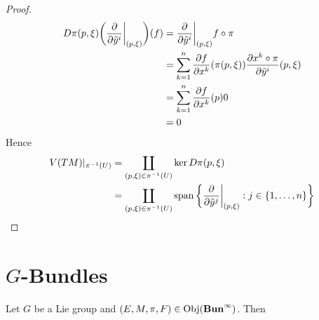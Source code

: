 \documentclass{book}
\begin{document}
\begin{proof}
		\begin{align*}
			D \pi (p, \xi) \bigg( \frac{\partial}{\partial \tilde{y}^i } \bigg|_{(p, \xi)} \bigg) (f)
			& = \frac{\partial}{\partial \tilde{y}^i} \bigg|_{(p, \xi)} f \circ \pi \\
			& = \sum_{k=1}^n \frac{\partial f }{\partial x^k}(\pi (p,\xi)) \frac{\partial x^k \circ \pi }{\partial \tilde{y}^i}(p,\xi) \\
			& = \sum_{k=1}^n \frac{\partial f }{\partial x^k}(p) 0 \\
			& = 0
		\end{align*}
		Hence 
		\begin{align*}
			V(TM)|_{\pi^{-1}(U)}
			& = \coprod_{(p, \xi) \in \pi^{-1}(U)} \ker D \pi(p, \xi) \\
			& = \coprod_{(p, \xi) \in \pi^{-1}(U)} \operatorname{span} \bigg \{ \frac{\partial}{\partial \tilde{y}^j} \bigg|_{(p, \xi)}: j \in \{1, \ldots, n\} \bigg \} 
		\end{align*}
	\end{proof}




	























	















	\newpage
	\newpage
	\chapter{$G$-Bundles}
	
	\begin{defn}
		Let $G$ be a Lie group and $(E, M, \pi, F) \in \operatorname{Obj}(\operatorname*{\text{\textbf{Bun}}^{\infty}})$. Then  
	\end{defn}
	
\end{document}
